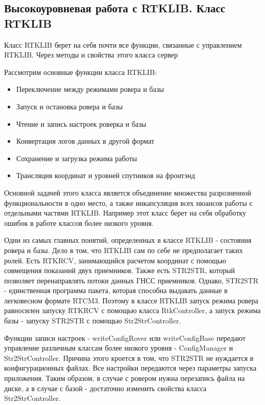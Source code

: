 \subsection{Высокоуровневая работа с RTKLIB. Класс RTKLIB} \label{subsect3_1_4}

Класс RTKLIB берет на себя почти все функции, связанные с управлением RTKLIB. Через методы и свойства этого класса сервер

Рассмотрим основные функции класса RTKLIB:

\begin{itemize}
  \item Переключение между режимами ровера и базы
  \item Запуск и остановка ровера и базы
  \item Чтение и запись настроек роверка и базы
  \item Конвертация логов данных в другой формат
  \item Сохранение и загрузка режима работы
  \item Трансляция координат и уровней спутников на фронтэнд
\end{itemize}

Основной задачей этого класса является объединение множества разрозненной функциональности в одно место, а также инкапсуляция всех нюансов работы с отдельными частями RTKLIB. Например этот класс берет на себя обработку ошибок в работе классов более низкого уровня.

Одни из самых главных понятий, определенных в классе RTKLIB - состояния ровера и базы. Дело в том, что RTKLIB сам по себе не предполагает таких ролей. Есть RTKRCV, занимающийся расчетом координат с помощью совмещения показаний двух приемников. Также есть STR2STR, который позволяет перенаправлять потоки данных ГНСС приемников. Однако, STR2STR - единственная программа пакета, которая способна выдавать данные в легковесном формате RTCM3. Поэтому в классе RTKLIB запуск режима ровера равносилен запуску RTKRCV с помощью класса RtkController, а запуск режима базы - запуску STR2STR с помощью Str2StrController.

Функции записи настроек - writeConfigRover или writeConfigBase передают управление различным классам более низкого уровня - ConfigManager и Str2StrController. Причина этого кроется в том, что STR2STR не нуждается в конфигурационных файлах. Все настройки передаются через параметры запуска приложения. Таким образом, в случае с ровером нужна перезапись файла на диске, а в случае с базой - достаточно изменить свойства класса Str2StrController.


